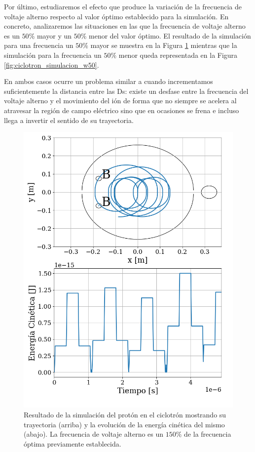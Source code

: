 \documentclass[journal]{IEEEtran}
\begin{document}
Por último, estudiaremos el efecto que produce la variación de la frecuencia de voltaje alterno respecto al valor óptimo establecido para la simulación. En concreto, analizaremos las situaciones en las que la frecuencia de voltaje alterno es un $50\%$ mayor y un $50\%$ menor del valor óptimo. El resultado de la simulación para una frecuencia un $50\%$ mayor se muestra en la Figura \ref{fig:ciclotron_simulacion_w150} mientras que la simulación para la frecuencia un $50\%$ menor queda representada en la Figura \ref{fig:ciclotron_simulacion_w50}.

En ambos casos ocurre un problema similar a cuando incrementamos suficientemente la distancia entre las Ds: existe un desfase entre la frecuencia del voltaje alterno y el movimiento del ión de forma que no siempre se acelera al atravesar la región de campo eléctrico sino que en ocasiones se frena e incluso llega a invertir el sentido de su trayectoria.

\begin{figure}[!htb]
    \centering
    \includegraphics[width=0.9\linewidth]{ciclotron_simulacion_w150.png}
    \caption{Resultado de la simulación del protón en el ciclotrón mostrando su trayectoria (arriba) y la evolución de la energía cinética del mismo (abajo). La frecuencia de voltaje alterno es un $150\%$ de la frecuencia óptima previamente establecida.}
    \label{fig:ciclotron_simulacion_w150}
\end{figure}
\end{document}
